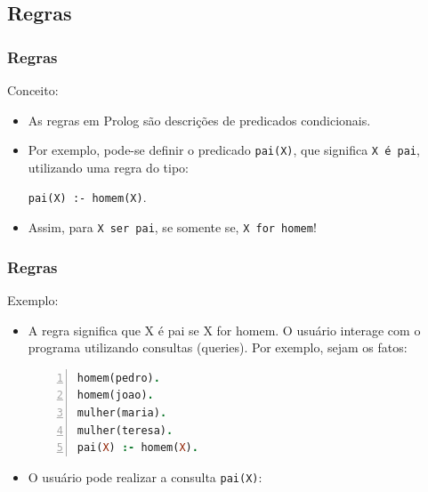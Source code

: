 \documentclass[sans]{beamer}
\begin{document}
\subsection{Regras} 
\begin{frame}[fragile]   %
\frametitle{Regras}

\begin{block}{Conceito:}
\begin{itemize}
  \item As regras em Prolog são descrições de predicados condicionais. 


\item Por exemplo, pode-se definir o predicado \texttt{pai(X)}, que significa \texttt{X é pai}, utilizando uma regra do tipo:

\vspace{0.5cm} 
\begin{center}
\texttt{pai(X) :- homem(X)}.
\end{center}
\vspace{0.5cm} 

\item Assim, para \texttt{X ser pai}, se somente se,  \texttt{X for homem}!
\end{itemize}
\end{block}
\end{frame}

\begin{frame}[fragile]
\frametitle{Regras}
\begin{block}{Exemplo:}
\begin{itemize} 

\item A regra significa que X é pai se X for homem.
O usuário interage com o programa utilizando consultas (queries). Por exemplo, sejam os fatos:
\begin{lstlisting}[language=Prolog, 
                   basicstyle=\footnotesize\ttfamily,
                  backgroundcolor=\color{azulclaro}, 
                  keywordstyle=\color{red},   
                  keepspaces=true,    
                  keywordstyle=\color{magenta},
     numberstyle=\tiny\color{magenta},
     commentstyle=\color{green},             
    numbers=left,                    
    numbersep=5pt]
homem(pedro).
homem(joao).
mulher(maria).
mulher(teresa).
pai(X) :- homem(X).
\end{lstlisting}
\item O usuário pode realizar a consulta \texttt{pai(X)}: 

\end{itemize} 
\end{block}
\end{frame}
\end{document}

